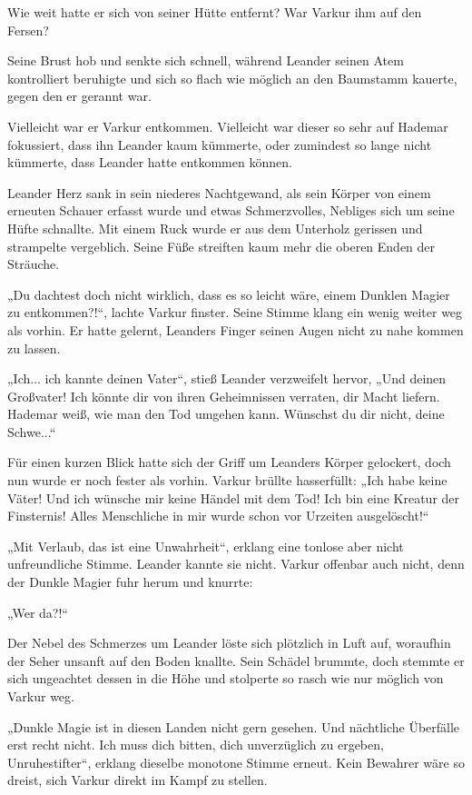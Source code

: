 \documentclass[10pt, a4paper, oneside]{book}
\begin{document}
Wie weit hatte er sich von seiner Hütte entfernt? War Varkur ihm auf den Fersen?

Seine Brust hob und senkte sich schnell, während Leander seinen Atem kontrolliert beruhigte und sich so flach wie möglich an den Baumstamm kauerte, gegen den er gerannt war.

Vielleicht war er Varkur entkommen. Vielleicht war dieser so sehr auf Hademar fokussiert, dass ihn Leander kaum kümmerte, oder zumindest so lange nicht kümmerte, dass Leander hatte entkommen können.

Leander Herz sank in sein niederes Nachtgewand, als sein Körper von einem erneuten Schauer erfasst wurde und etwas Schmerzvolles, Nebliges sich um seine Hüfte schnallte. Mit einem Ruck wurde er aus dem Unterholz gerissen und strampelte vergeblich. Seine Füße streiften kaum mehr die oberen Enden der Sträuche.

„Du dachtest doch nicht wirklich, dass es so leicht wäre, einem Dunklen Magier zu entkommen?!“, lachte Varkur finster. Seine Stimme klang ein wenig weiter weg als vorhin. Er hatte gelernt, Leanders Finger seinen Augen nicht zu nahe kommen zu lassen.

„Ich... ich kannte deinen Vater“, stieß Leander verzweifelt hervor, „Und deinen Großvater! Ich könnte dir von ihren Geheimnissen verraten, dir Macht liefern. Hademar weiß, wie man den Tod umgehen kann. Wünschst du dir nicht, deine Schwe...“

Für einen kurzen Blick hatte sich der Griff um Leanders Körper gelockert, doch nun wurde er noch fester als vorhin. Varkur brüllte hasserfüllt: „Ich habe keine Väter! Und ich wünsche mir keine Händel mit dem Tod! Ich bin eine Kreatur der Finsternis! Alles Menschliche in mir wurde schon vor Urzeiten ausgelöscht!“

„Mit Verlaub, das ist eine Unwahrheit“, erklang eine tonlose aber nicht unfreundliche Stimme. Leander kannte sie nicht. Varkur offenbar auch nicht, denn der Dunkle Magier fuhr herum und knurrte:

„Wer da?!“

Der Nebel des Schmerzes um Leander löste sich plötzlich in Luft auf, woraufhin der Seher unsanft auf den Boden knallte. Sein Schädel brummte, doch stemmte er sich ungeachtet dessen in die Höhe und stolperte so rasch wie nur möglich von Varkur weg.

„Dunkle Magie ist in diesen Landen nicht gern gesehen. Und nächtliche Überfälle erst recht nicht. Ich muss dich bitten, dich unverzüglich zu ergeben, Unruhestifter“, erklang dieselbe monotone Stimme erneut. Kein Bewahrer wäre so dreist, sich Varkur direkt im Kampf zu stellen.
\end{document}
